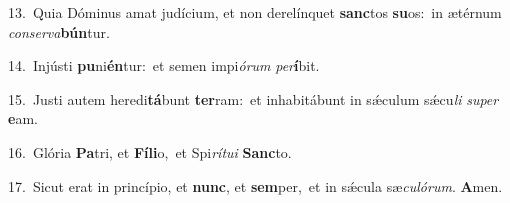 {\numbfont\textcolor{\numbcolor}{13.}}~Quia Dóminus amat judícium, et non derelínquet \textbf{sanc}\-tos \textbf{su}\-os:~\star in ætérnum \textit{con}\-\textit{ser}\textit{va}\textbf{bún}tur.\par
{\numbfont\textcolor{\numbcolor}{14.}}~Injústi \textbf{pu}\-ni\-\textbf{én}\-tur:~\star et semen impi\-\textit{ó}\-\textit{rum} \textit{per}\-\textbf{í}bit.\par
{\numbfont\textcolor{\numbcolor}{15.}}~Justi autem heredi\-\textbf{tá}\-bunt \textbf{ter}\-ram:~\star et inhabitábunt in sǽculum sǽcu\textit{li} \textit{su}\-\textit{per} \textbf{e}\-am.\par
{\numbfont\textcolor{\numbcolor}{16.}}~Glória \textbf{Pa}\-tri, et \textbf{Fí}\-\textbf{li}o,~\star et Spi\-\textit{rí}\-\textit{tu}\textit{i} \textbf{Sanc}\-to.\par
{\numbfont\textcolor{\numbcolor}{17.}}~Sicut erat in princípio, et \textbf{nunc}\-, et \textbf{sem}\-per,~\star et in sǽcula sæ\-\textit{cu}\-\textit{ló}\textit{rum}. \textbf{A}\-men.\par
